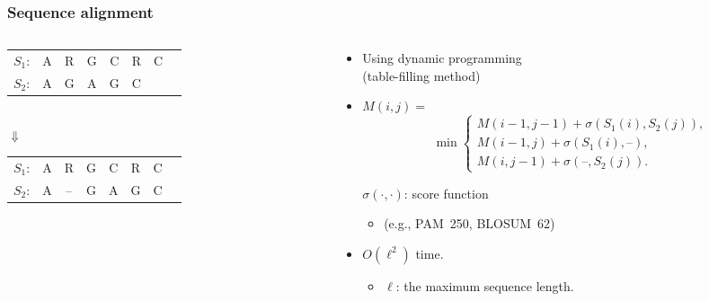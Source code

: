 \documentclass[xcolor=dvipsnames,envcountsect,handout]{beamer}
\begin{document}
\begin{frame}
\frametitle{Sequence alignment}
\vspace{-8pt}
\begin{columns}
\begin{column}[t]{4cm}
\begin{small}
\begin{table}[H]
\begin{tabular}{c c c c c c c c}
$S_1$:  & A & R & G & C & R & C  \\
$S_2$:  & A & G & A & G & C &   
\end{tabular}
\vspace{12pt}\\$\Downarrow$\vspace{12pt}\\
\begin{tabular}{c c c c c c c c}
$S_1$:  & A & R  & G & C & R & C  \\
$S_2$:  & A & -- & G & A & G & C
\end{tabular}
\end{table}
\end{small}
\end{column}
\begin{column}[t]{7cm}
\vspace{-6pt}
\begin{itemize}
\item Using dynamic programming \\
(table-filling method)
\vspace{8pt}
\item [] \begin{small}
$M(i,j) = $
\[
\min\left\{\!\!
\begin{array}{l}
M(i-1,j-1) + \sigma(S_1(i),S_2(j)),\\
M(i-1,j)   + \sigma(S_1(i), \mbox{--}),\\
M(i,j-1)   + \sigma(\mbox{--}, S_2(j)). 
\end{array}
\right.
\]
\end{small}
\hspace{20pt} 
\begin{small}
$\sigma(\cdot,\cdot)$: score function 
\begin{itemize}
\item [] (e.g., PAM~250, BLOSUM~62)
\end{itemize}
\end{small}
\vspace{6pt}
\item $O(\ell^2)$ time. 
\begin{itemize}
\item $\ell$: the maximum sequence length.
\end{itemize}
\end{itemize}
\end{column}
\end{columns}
\end{frame}
\end{document}
